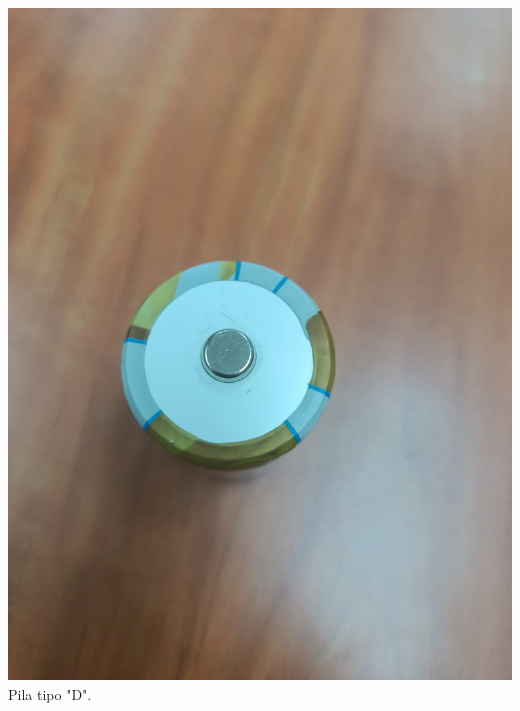 \documentclass[10pt]{article}
\begin{document}
\begin{multicols}{2}
\begin{center}
	\includegraphics[scale = 0.1]{Imagenes/Material/PilaD.jpeg}\\
	Pila tipo "D".\\

\end{center}
\end{multicols}
\end{document}
